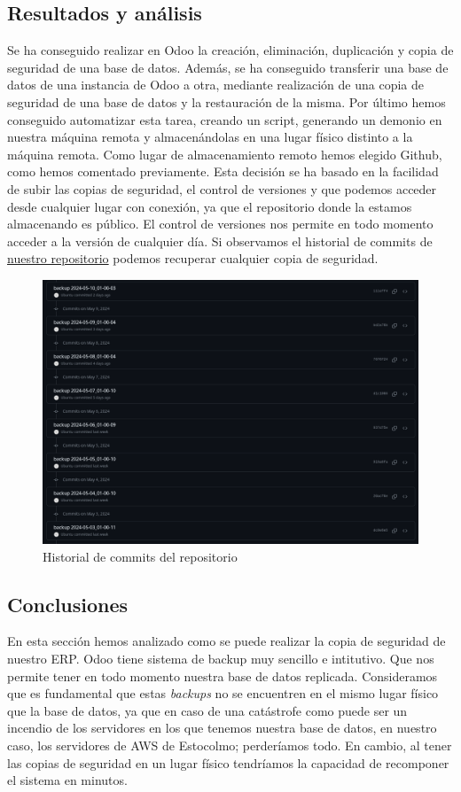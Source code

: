 \subsection{Resultados y análisis}
Se ha conseguido realizar en Odoo la creación, eliminación, duplicación y copia de seguridad de una base de datos. Además, se ha conseguido transferir una base de datos de una instancia de Odoo a otra, mediante realización de una copia de seguridad de una base de datos y la restauración de la misma. Por último hemos conseguido automatizar esta tarea, creando un script, generando un demonio en nuestra máquina remota y almacenándolas en una lugar físico distinto a la máquina remota. Como lugar de almacenamiento remoto hemos elegido Github, como hemos comentado previamente. Esta decisión se ha basado en la facilidad de subir las copias de seguridad, el control de versiones y que podemos acceder desde cualquier lugar con conexión, ya que el repositorio donde la estamos almacenando es público. El control de versiones nos permite en todo momento acceder a la versión de cualquier día. Si observamos el historial de commits de \href{https://github.com/Practicass/sisInfo2_proyect/commits/main/}{nuestro repositorio} podemos recuperar cualquier copia de seguridad. 
\newpage
\begin{figure}[h]
    \centering
    \includegraphics[width=1\linewidth]{backup/commits.png}
    \caption{Historial de commits del repositorio}
\end{figure}
\subsection{Conclusiones}
En esta sección hemos analizado como se puede realizar la copia de seguridad de nuestro ERP. Odoo tiene sistema de backup muy sencillo e intitutivo. Que nos permite tener en todo momento nuestra base de datos replicada. Consideramos que es fundamental que estas \textit{backups} no se encuentren en el mismo lugar físico que la base de datos, ya que en caso de una catástrofe como puede ser un incendio de los servidores en los que tenemos nuestra base de datos, en nuestro caso, los servidores de AWS de Estocolmo; perderíamos todo. En cambio, al tener las copias de seguridad en un lugar físico tendríamos la capacidad de recomponer el sistema en minutos.

